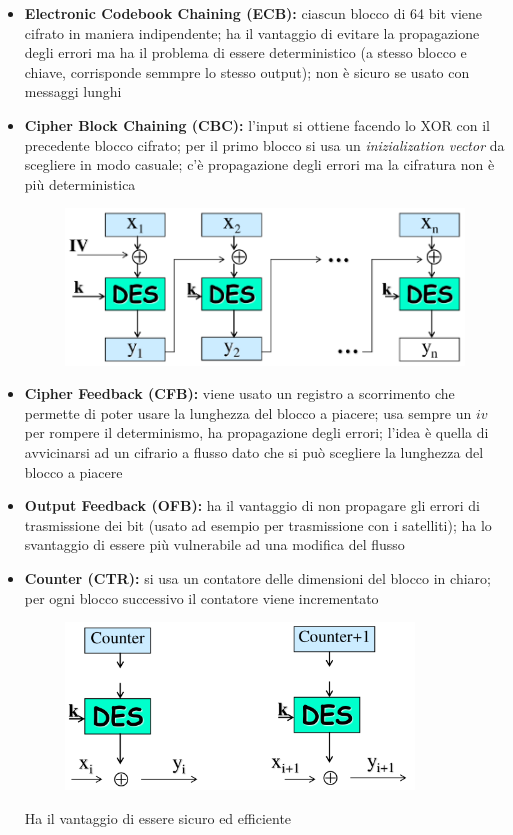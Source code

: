 \begin{itemize}
    \item \textbf{Electronic Codebook Chaining (ECB):} ciascun blocco di 64 bit viene 
    cifrato in maniera indipendente; ha il vantaggio di evitare la propagazione degli errori ma ha 
    il problema di essere deterministico (a stesso blocco e chiave, corrisponde semmpre lo stesso output); non 
    è sicuro se usato con messaggi lunghi

    \item \textbf{Cipher Block Chaining (CBC):} l'input si ottiene facendo lo XOR con il precedente 
    blocco cifrato; per il primo blocco si usa un \textit{inizialization vector} da scegliere in modo casuale;
    c'è propagazione degli errori ma la cifratura non è più deterministica

    \begin{figure}[H]
        \centering
        \includegraphics[width=0.6\linewidth]{chapters/chap03/images/cbc.png}
    \end{figure}

    \item \textbf{Cipher Feedback (CFB):} viene usato un registro a scorrimento che permette di poter 
    usare la lunghezza del blocco a piacere; usa sempre un $iv$ per rompere il determinismo, ha propagazione 
    degli errori; l'idea è quella di avvicinarsi ad un cifrario a flusso dato che si può scegliere la lunghezza del 
    blocco a piacere 

    \item \textbf{Output Feedback (OFB):} ha il vantaggio di non propagare gli errori di trasmissione 
    dei bit (usato ad esempio per trasmissione con i satelliti); ha lo svantaggio di essere più 
    vulnerabile ad una modifica del flusso 

    \item \textbf{Counter (CTR):} si usa un contatore delle dimensioni del blocco in chiaro; per ogni 
    blocco successivo il contatore viene incrementato

    \begin{figure}[H]
        \centering
        \includegraphics[width=0.6\linewidth]{chapters/chap03/images/ctr.png}
    \end{figure}

    \noindent Ha il vantaggio di essere sicuro ed efficiente

\end{itemize}

